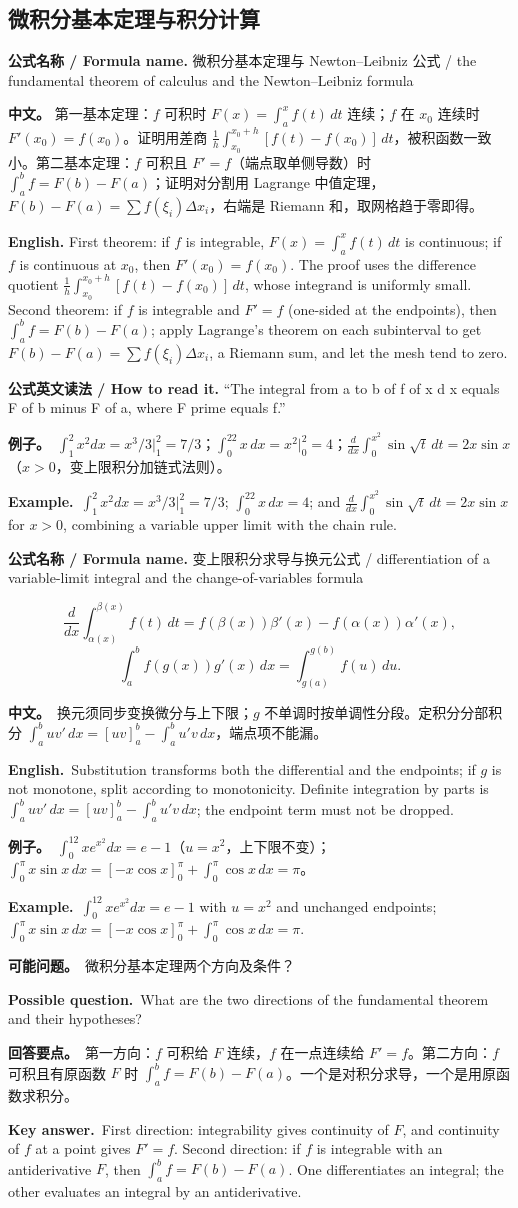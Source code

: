 \documentclass[UTF8,11pt,a4paper]{ctexart}
\newcommand{\BOTH}[2]{\par\noindent\textbf{中文。}\ #1\par\noindent\textbf{English.}\ #2\par}
\newcommand{\EX}[2]{\par\noindent\textbf{例子。}\ #1\par\noindent\textbf{Example.}\ #2\par}
\newcommand{\READ}[1]{\par\noindent\textbf{公式英文读法 / How to read it.} #1\par}
\newcommand{\FORMULA}[2]{\par\noindent\textbf{公式名称 / Formula name.} #1 / #2\par}
\newcommand{\ASK}[4]{\begin{samepage}\par\noindent\textbf{可能问题。}\ #1\par\noindent\textbf{Possible question.}\ #2\par\noindent\textbf{回答要点。}\ #3\par\noindent\textbf{Key answer.}\ #4\medskip\end{samepage}}
\newcommand{\APS}[2]{\par\noindent\textbf{中文。} #1\par\noindent\textbf{English.} #2\par\smallskip}
\begin{document}
\subsection{微积分基本定理与积分计算}
\FORMULA{微积分基本定理与 Newton--Leibniz 公式}{the fundamental theorem of calculus and the Newton--Leibniz formula}
\APS{第一基本定理：$f$ 可积时 $F(x)=\int_a^xf(t)\,dt$ 连续；$f$ 在 $x_0$ 连续时 $F'(x_0)=f(x_0)$。证明用差商 $\frac1h\int_{x_0}^{x_0+h}[f(t)-f(x_0)]\,dt$，被积函数一致小。第二基本定理：$f$ 可积且 $F'=f$（端点取单侧导数）时 $\int_a^bf=F(b)-F(a)$；证明对分割用 Lagrange 中值定理，$F(b)-F(a)=\sum f(\xi_i)\Delta x_i$，右端是 Riemann 和，取网格趋于零即得。}{First theorem: if $f$ is integrable, $F(x)=\int_a^xf(t)\,dt$ is continuous; if $f$ is continuous at $x_0$, then $F'(x_0)=f(x_0)$. The proof uses the difference quotient $\frac1h\int_{x_0}^{x_0+h}[f(t)-f(x_0)]\,dt$, whose integrand is uniformly small. Second theorem: if $f$ is integrable and $F'=f$ (one-sided at the endpoints), then $\int_a^bf=F(b)-F(a)$; apply Lagrange's theorem on each subinterval to get $F(b)-F(a)=\sum f(\xi_i)\Delta x_i$, a Riemann sum, and let the mesh tend to zero.}
\READ{“The integral from a to b of f of x d x equals F of b minus F of a, where F prime equals f.”}
\EX{$\int_1^2x^2dx=x^3/3\big|_1^2=7/3$；$\int_0^22x\,dx=x^2\big|_0^2=4$；$\frac{d}{dx}\int_0^{x^2}\sin\sqrt t\,dt=2x\sin x$（$x>0$，变上限积分加链式法则）。}{$\int_1^2x^2dx=x^3/3\big|_1^2=7/3$; $\int_0^22x\,dx=4$; and $\frac{d}{dx}\int_0^{x^2}\sin\sqrt t\,dt=2x\sin x$ for $x>0$, combining a variable upper limit with the chain rule.}
\FORMULA{变上限积分求导与换元公式}{differentiation of a variable-limit integral and the change-of-variables formula}
\[
\frac{d}{dx}\int_{\alpha(x)}^{\beta(x)}f(t)\,dt=f(\beta(x))\beta'(x)-f(\alpha(x))\alpha'(x),
\]
\[
\int_a^b f(g(x))g'(x)\,dx=\int_{g(a)}^{g(b)}f(u)\,du .
\]
\BOTH{换元须同步变换微分与上下限；$g$ 不单调时按单调性分段。定积分分部积分 $\int_a^bu v'\,dx=[uv]_a^b-\int_a^bu'v\,dx$，端点项不能漏。}{Substitution transforms both the differential and the endpoints; if $g$ is not monotone, split according to monotonicity. Definite integration by parts is $\int_a^bu v'\,dx=[uv]_a^b-\int_a^bu'v\,dx$; the endpoint term must not be dropped.}
\EX{$\int_0^12xe^{x^2}dx=e-1$（$u=x^2$，上下限不变）；$\int_0^{\pi}x\sin x\,dx=[-x\cos x]_0^{\pi}+\int_0^{\pi}\cos x\,dx=\pi$。}{$\int_0^12xe^{x^2}dx=e-1$ with $u=x^2$ and unchanged endpoints; $\int_0^{\pi}x\sin x\,dx=[-x\cos x]_0^{\pi}+\int_0^{\pi}\cos x\,dx=\pi$.}
\ASK{微积分基本定理两个方向及条件？}{What are the two directions of the fundamental theorem and their hypotheses?}{第一方向：$f$ 可积给 $F$ 连续，$f$ 在一点连续给 $F'=f$。第二方向：$f$ 可积且有原函数 $F$ 时 $\int_a^bf=F(b)-F(a)$。一个是对积分求导，一个是用原函数求积分。}{First direction: integrability gives continuity of $F$, and continuity of $f$ at a point gives $F'=f$. Second direction: if $f$ is integrable with an antiderivative $F$, then $\int_a^bf=F(b)-F(a)$. One differentiates an integral; the other evaluates an integral by an antiderivative.}
\end{document}

